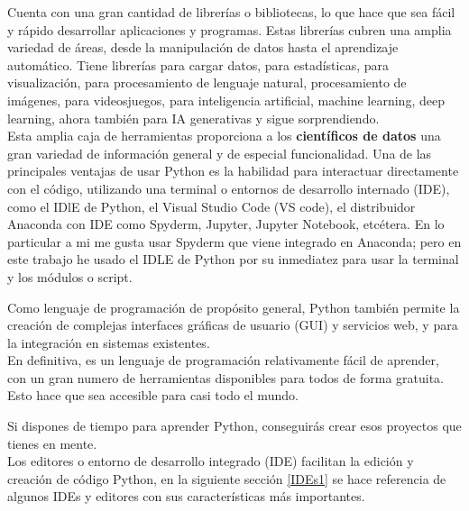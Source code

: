 Cuenta con una gran cantidad de librerías o bibliotecas, lo que hace que sea fácil y rápido desarrollar aplicaciones y programas. Estas librerías cubren una amplia variedad de áreas, desde la manipulación de datos hasta el aprendizaje automático. Tiene librerías para cargar datos, para estadísticas, para visualización, para procesamiento de lenguaje natural, procesamiento de imágenes, para videosjuegos, para inteligencia artificial, machine learning, deep learning, ahora también para IA generativas y sigue sorprendiendo.\\ 





Esta amplia caja de herramientas proporciona a los {\bf científicos de datos} una gran variedad
de información general y de especial funcionalidad. Una de las principales ventajas de usar Python es la habilidad para interactuar directamente con el código, utilizando una terminal o entornos de desarrollo internado (IDE), como el IDlE de Python, el Visual Studio Code (VS code), el distribuidor Anaconda con IDE como Spyderm, Jupyter, Jupyter Notebook,  etcétera.  En lo particular a mi me gusta usar Spyderm que viene integrado en Anaconda;  pero en este trabajo he usado el IDLE de Python por su inmediatez  para usar la terminal y los módulos o script. 

Como lenguaje de programación de propósito general, Python también permite la creación de complejas interfaces gráficas de usuario (GUI) y servicios web, y para la integración en sistemas existentes.\\



En definitiva, es un lenguaje de programación relativamente fácil de aprender, con un gran numero de herramientas  disponibles para todos de forma gratuita.  Esto hace que sea accesible para casi todo el mundo. 

Si dispones de tiempo para aprender Python, conseguirás crear esos proyectos que tienes en mente.\\


Los editores o entorno de desarrollo integrado (IDE)  facilitan la edición y creación de código Python, en la siguiente sección \ref{IDEs1} se hace referencia de algunos IDEs y editores con sus características más importantes.


